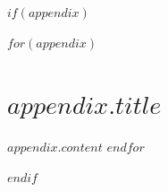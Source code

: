
$if(appendix)$
\appendix

$for(appendix)$
\section{$appendix.title$}
$appendix.content$
$endfor$

$endif$

